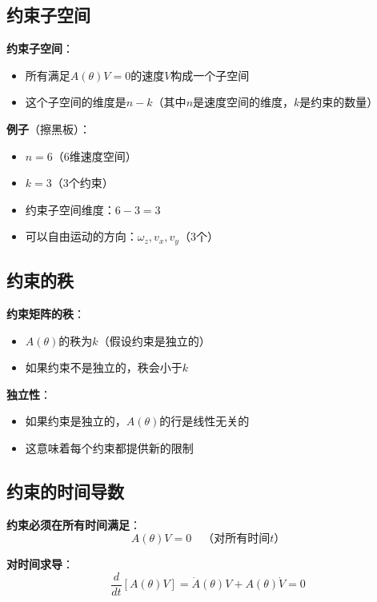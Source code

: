 \documentclass[12pt,a4paper]{article}
\begin{document}
\subsection{约束子空间}

\textbf{约束子空间}：
\begin{itemize}
\item 所有满足$A(\theta)V = 0$的速度$V$构成一个子空间
\item 这个子空间的维度是$n - k$（其中$n$是速度空间的维度，$k$是约束的数量）
\end{itemize}

\textbf{例子}（擦黑板）：
\begin{itemize}
\item $n = 6$（6维速度空间）
\item $k = 3$（3个约束）
\item 约束子空间维度：$6 - 3 = 3$
\item 可以自由运动的方向：$\omega_z, v_x, v_y$（3个）
\end{itemize}

\subsection{约束的秩}

\textbf{约束矩阵的秩}：
\begin{itemize}
\item $A(\theta)$的秩为$k$（假设约束是独立的）
\item 如果约束不是独立的，秩会小于$k$
\end{itemize}

\textbf{独立性}：
\begin{itemize}
\item 如果约束是独立的，$A(\theta)$的行是线性无关的
\item 这意味着每个约束都提供新的限制
\end{itemize}

\subsection{约束的时间导数}

\textbf{约束必须在所有时间满足}：
\begin{equation}
A(\theta)V = 0 \quad \text{（对所有时间$t$）}
\end{equation}

\textbf{对时间求导}：
\begin{equation}
\frac{d}{dt}[A(\theta)V] = \dot{A}(\theta)V + A(\theta)\dot{V} = 0
\end{equation}
\end{document}
